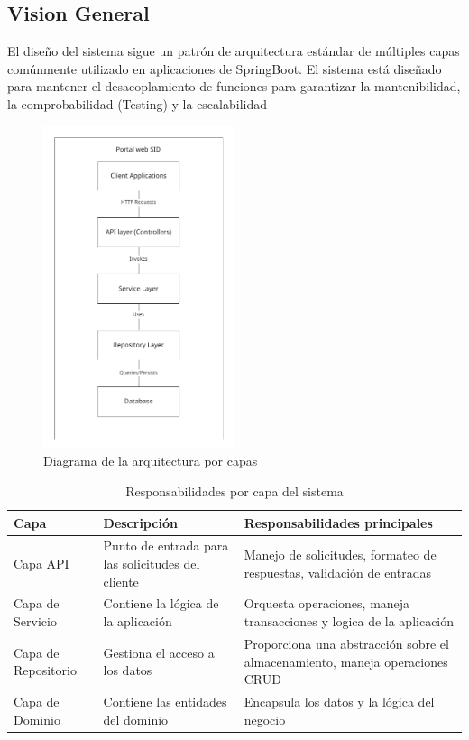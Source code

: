 \documentclass[11pt,a4paper]{article}
\begin{document}
\subsection{Vision General}
El diseño del sistema sigue un patrón de arquitectura estándar de múltiples capas comúnmente utilizado en aplicaciones de SpringBoot.
El sistema está diseñado para mantener el desacoplamiento de funciones para garantizar la mantenibilidad, la comprobabilidad (Testing) y la
escalabilidad
\begin{figure}[H]
	\centering
	\includegraphics[width=0.5\textwidth]{src/SID_PortalWEB_D1.pdf}
	\caption{Diagrama de la arquitectura por capas}
\end{figure}

\begin{table}[h!]
	\centering
	\begin{tabular}{|l|p{4cm}|p{7cm}|}
		\hline
		\textbf{Capa}       & \textbf{Descripción}                              & \textbf{Responsabilidades principales}                                       \\
		\hline
		Capa API            & Punto de entrada para las solicitudes del cliente & Manejo de solicitudes, formateo de respuestas, validación de entradas        \\
		\hline
		Capa de Servicio    & Contiene la lógica de la aplicación               & Orquesta operaciones, maneja transacciones y logica de la aplicación         \\
		\hline
		Capa de Repositorio & Gestiona el acceso a los datos                    & Proporciona una abstracción sobre el almacenamiento, maneja operaciones CRUD \\
		\hline
		Capa de Dominio     & Contiene las entidades del dominio                & Encapsula los datos y la lógica del negocio                                  \\
		\hline
	\end{tabular}
	\caption{Responsabilidades por capa del sistema}
\end{table}
\end{document}
